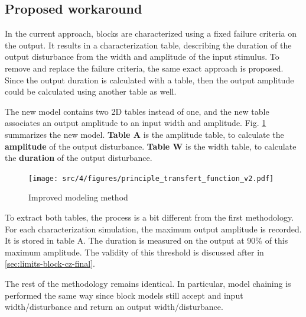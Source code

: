\subsection{Proposed workaround}

%
In the current approach, blocks are characterized using a fixed failure criteria on the output.
It results in a characterization table, describing the duration of the output disturbance from the width and amplitude of the input stimulus.
To remove and replace the failure criteria, the same exact approach is proposed.
Since the output duration is calculated with a table, then the output amplitude could be calculated using another table as well.

The new model contains two 2D tables instead of one, and the new table associates an output amplitude to an input width and amplitude.
Fig. \ref{fig:principle-transfert-func-v2} summarizes the new model.
\textbf{Table A} is the amplitude table, to calculate the \textbf{amplitude} of the output disturbance.
\textbf{Table W} is the width table, to calculate the \textbf{duration} of the output disturbance.

\begin{figure}[!h]
  \centering
  \texttt{[image: src/4/figures/principle\_transfert\_function\_v2.pdf]}
  \caption{Improved modeling method}
  \label{fig:principle-transfert-func-v2}
\end{figure}

To extract both tables, the process is a bit different from the first methodology.
For each characterization simulation, the maximum output amplitude is recorded.
It is stored in table A.
The duration is measured on the output at 90\% of this maximum amplitude.
The validity of this threshold is discussed after in \ref{sec:limits-block-cz-final}.

The rest of the methodology remains identical.
In particular, model chaining is performed the same way since block models still accept and input width/disturbance and return an output width/disturbance.



